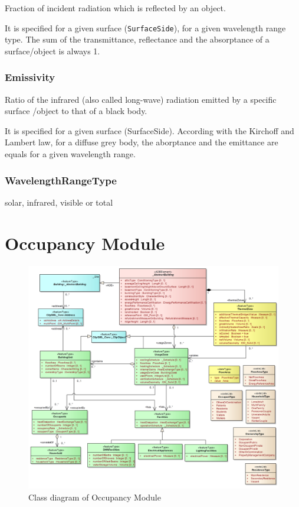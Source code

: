 \documentclass[a4paper,12pt]{article}
\let\stdsection\section%
\renewcommand\section{\newpage\stdsection}
\begin{document}
Fraction of incident radiation which is reflected by an object.

It is specified for a given surface (\texttt{SurfaceSide}), for a given
wavelength range type. The sum of the transmittance, reflectance and the
absorptance of a surface/object is always 1.

\subsubsection{Emissivity}\label{emissivity}

Ratio of the infrared (also called long-wave) radiation emitted by a
specific surface /object to that of a black body.

It is specified for a given surface (SurfaceSide). According with the
Kirchoff and Lambert law, for a diffuse grey body, the aborptance and
the emittance are equals for a given wavelength range.

\subsubsection{WavelengthRangeType}\label{wavelengthrangetype}

solar, infrared, visible or total

\section{Occupancy Module}\label{occupancy-module}

\begin{figure}[htbp]
\centering
\includegraphics{fig/class_occupancy.png}
\caption{Class diagram of Occupancy Module}
\end{figure}
\end{document}
